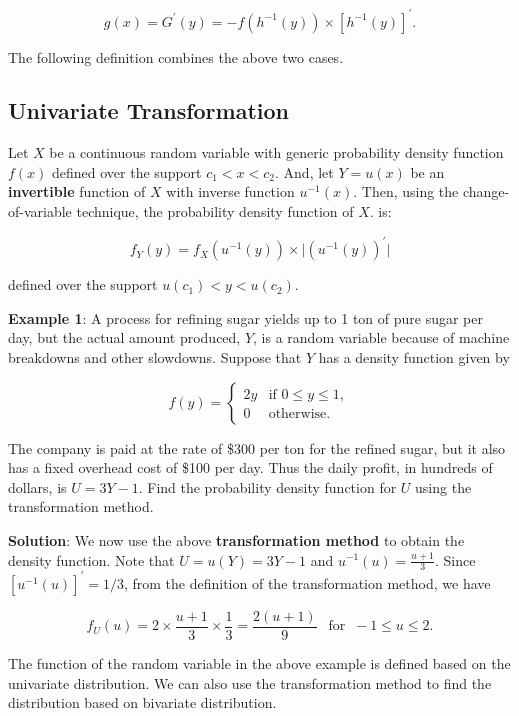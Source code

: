 \documentclass[
]{book}
\begin{document}
\[
g(x) = G^\prime (y) = -f(h^{-1}(y))\times [h^{-1}(y)]^\prime.
\]

The following definition combines the above two cases.

\hypertarget{univariate-transformation}{%
\subsection{Univariate Transformation}\label{univariate-transformation}}

Let \(X\) be a continuous random variable with generic probability density function \(f(x)\) defined over the support \(c_1< x < c_2\). And, let \(Y=u(x)\) be an \textbf{invertible} function of \(X\) with inverse function \(u^{-1}(x)\). Then, using the change-of-variable technique, the probability density function of \(X\). is:

\[
f_Y(y) = f_X(u^{-1}(y))\times \bigg|(u^{-1}(y))^\prime\bigg|
\]

defined over the support \(u(c_1) < y < u(c_2)\).

\textbf{\color{red} Example 1}: A process for refining sugar yields up to 1 ton of pure sugar per day, but the actual amount produced, \(Y\), is a random variable because of machine breakdowns and other slowdowns. Suppose that \(Y\) has a density function given by

\[
\displaystyle f(y) = \begin{cases} 
 2y & \text{if $0 \le y \le 1$}, \\  
 0 & \text{otherwise}.
 \end{cases}
\]

The company is paid at the rate of \$300 per ton for the refined sugar, but it also has a fixed overhead cost of \$100 per day. Thus the daily profit, in hundreds of dollars, is \(U = 3Y-1\). Find the probability density function for \(U\) using the transformation method.

\textbf{Solution}: We now use the above \textbf{transformation method} to obtain the density function. Note that \(U=u(Y) = 3Y -1\) and \(u^{-1}(u) = \frac{u+1}{3}\). Since \([u^{-1}(u)]^\prime = 1/3\), from the definition of the transformation method, we have

\[
f_U(u) = 2\times \frac{u+1}{3}\times \frac{1}{3} = \frac{2(u+1)}{9} \ \ \text{ for } \  -1 \le u \le 2.
\]

The function of the random variable in the above example is defined based on the univariate distribution. We can also use the transformation method to find the distribution based on bivariate distribution.
\end{document}

